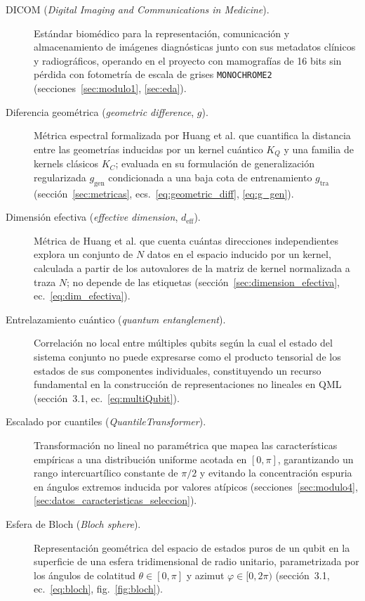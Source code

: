 \begin{description}
  \item[DICOM (\textit{Digital Imaging and Communications in Medicine}).] Estándar biomédico para la representación, comunicación y almacenamiento de imágenes diagnósticas junto con sus metadatos clínicos y radiográficos, operando en el proyecto con mamografías de 16 bits sin pérdida con fotometría de escala de grises \texttt{MONOCHROME2} (secciones~\ref{sec:modulo1}, \ref{sec:eda}).

  \item[Diferencia geométrica (\textit{geometric difference}, $g$).] Métrica espectral formalizada por Huang et al. que cuantifica la distancia entre las geometrías inducidas por un kernel cuántico $K_Q$ y una familia de kernels clásicos $K_C$; evaluada en su formulación de generalización regularizada $g_{\mathrm{gen}}$ condicionada a una baja cota de entrenamiento $g_{\mathrm{tra}}$ (sección~\ref{sec:metricas}, ecs.~\ref{eq:geometric_diff}, \ref{eq:g_gen}).

  \item[Dimensión efectiva (\textit{effective dimension}, $d_{\mathrm{eff}}$).] Métrica de Huang et al. que cuenta cuántas direcciones independientes explora un conjunto de $N$ datos en el espacio inducido por un kernel, calculada a partir de los autovalores de la matriz de kernel normalizada a traza $N$; no depende de las etiquetas (sección~\ref{sec:dimension_efectiva}, ec.~\ref{eq:dim_efectiva}).

  \item[Entrelazamiento cuántico (\textit{quantum entanglement}).] Correlación no local entre múltiples qubits según la cual el estado del sistema conjunto no puede expresarse como el producto tensorial de los estados de sus componentes individuales, constituyendo un recurso fundamental en la construcción de representaciones no lineales en QML (sección~3.1, ec.~\ref{eq:multiQubit}).

  \item[Escalado por cuantiles (\textit{QuantileTransformer}).] Transformación no lineal no paramétrica que mapea las características empíricas a una distribución uniforme acotada en $[0, \pi]$, garantizando un rango intercuartílico constante de $\pi/2$ y evitando la concentración espuria en ángulos extremos inducida por valores atípicos (secciones~\ref{sec:modulo4}, \ref{sec:datos_caracteristicas_seleccion}).

  \item[Esfera de Bloch (\textit{Bloch sphere}).] Representación geométrica del espacio de estados puros de un qubit en la superficie de una esfera tridimensional de radio unitario, parametrizada por los ángulos de colatitud $\theta \in [0, \pi]$ y azimut $\varphi \in [0, 2\pi)$ (sección~3.1, ec.~\ref{eq:bloch}, fig.~\ref{fig:bloch}).


\end{description}
